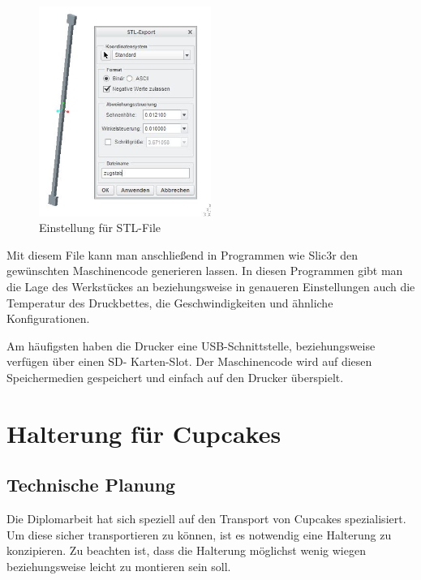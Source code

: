 			\begin{figure}[tbh]
			\begin{centering}
			\includegraphics[width = 0.5\textwidth]{Bilder/stl_file_optionen}
			\par\end{centering}
	 		\caption{Einstellung für STL-File}
			\label{stl_file_optionen}
			\end{figure}

		Mit diesem File kann man anschließend in Programmen wie Slic3r den gewünschten Maschinencode generieren lassen.
		In diesen Programmen gibt man die Lage des Werkstückes an beziehungsweise in genaueren Einstellungen auch die Temperatur des Druckbettes, die Geschwindigkeiten und ähnliche Konfigurationen.

		Am häufigsten haben die Drucker eine USB-Schnittstelle, beziehungsweise verfügen über einen SD- Karten-Slot.
		Der Maschinencode wird auf diesen Speichermedien gespeichert und einfach auf den Drucker überspielt.

				\newpage


\section{Halterung für Cupcakes}

		\subsection{Technische Planung}

		Die Diplomarbeit hat sich speziell auf den Transport von Cupcakes spezialisiert. Um diese sicher transportieren zu können, ist es notwendig eine Halterung zu konzipieren.
		Zu beachten ist, dass die Halterung möglichst wenig wiegen beziehungsweise leicht zu montieren sein soll.

